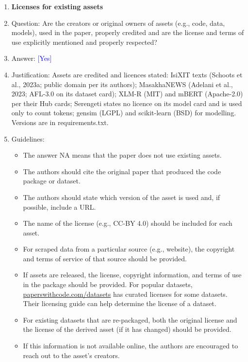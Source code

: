\documentclass[10pt,letterpaper]{article}
\newcommand{\answerYes}[1][]{\textcolor{blue}{[Yes] #1}}
\begin{document}
\begin{enumerate}
\item {\bf Licenses for existing assets}
    \item[] Question: Are the creators or original owners of assets (e.g., code, data, models), used in the paper, properly credited and are the license and terms of use explicitly mentioned and properly respected?
    \item[] Answer: \answerYes{}
    \item[] Justification: Assets are credited and licences stated: IsiXIT texts (Schoots et al., 2023a; public domain per its authors); MasakhaNEWS (Adelani et al., 2023; AFL-3.0 on its dataset card); XLM-R (MIT) and mBERT (Apache-2.0) per their Hub cards; Serengeti states no licence on its model card and is used only to count tokens; gensim (LGPL) and scikit-learn (BSD) for modelling. Versions are in requirements.txt.
    \item[] Guidelines:
    \begin{itemize}
        \item The answer NA means that the paper does not use existing assets.
        \item The authors should cite the original paper that produced the code package or dataset.
        \item The authors should state which version of the asset is used and, if possible, include a URL.
        \item The name of the license (e.g., CC-BY 4.0) should be included for each asset.
        \item For scraped data from a particular source (e.g., website), the copyright and terms of service of that source should be provided.
        \item If assets are released, the license, copyright information, and terms of use in the package should be provided. For popular datasets, \url{paperswithcode.com/datasets} has curated licenses for some datasets. Their licensing guide can help determine the license of a dataset.
        \item For existing datasets that are re-packaged, both the original license and the license of the derived asset (if it has changed) should be provided.
        \item If this information is not available online, the authors are encouraged to reach out to the asset's creators.
    \end{itemize}


\end{enumerate}
\end{document}
